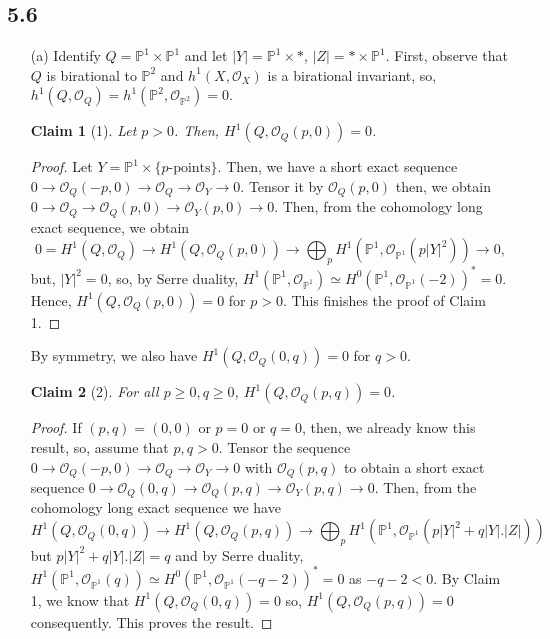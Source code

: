 \documentclass[11pt]{amsart}          %
\newcommand{\calO}{\mathcal{O}}
\newcommand{\bbP}{\mathbb{P}}
\newtheorem*{claim}{Claim}
\begin{document}
\subsection*{5.6}
\begin{enumerate}
\item [(a)] Identify $Q = \bbP^1 \times \bbP^1$ and let $|Y| = \bbP^1 \times *$, $|Z| = * \times \bbP^1$. First, observe that $Q$ is birational to $\bbP^2$ and $h^1 (X, \calO_X)$ is a birational invariant, so, $h^1(Q, \calO_Q) = h^1(\bbP^2, \calO_{\bbP^2}) = 0$. 

\begin{claim}[1] Let $p>0$. Then, $H^1(Q, \calO_Q (p,0)) = 0$.
\end{claim}

\begin{proof} Let $Y = \bbP^1 \times \{ p\mbox{-points} \}$. Then, we have a short exact sequence $0 \to \calO_Q (-p, 0) \to \calO_Q \to \calO_Y \to 0$. Tensor it by $\calO_Q (p,0)$ then, we obtain $0 \to \calO_Q \to \calO_Q (p,0) \to \calO_Y (p,0) \to 0$. Then, from the cohomology long exact sequence, we obtain
$$0 = H^1(Q, \calO_Q) \to H^1(Q, \calO_Q (p,0)) \to \bigoplus_p H^1(\bbP^1, \calO_{\bbP^1} (p |Y|^2)) \to 0,$$ but, $|Y|^2 = 0$, so, by Serre duality, $H^1(\bbP^1, \calO_{\bbP^1}) \simeq H^0 (\bbP^1, \calO_{\bbP^1} (-2) )^* = 0$. Hence, $H^1(Q, \calO_Q(p,0)) = 0$ for $p>0$. This finishes the proof of Claim 1.
\end{proof}

By symmetry, we also have $H^1(Q, \calO_Q (0,q)) = 0$ for $q>0$.

\begin{claim} [2] For all $p \geq 0, q \geq 0$, $H^1(Q, \calO_Q (p,q)) = 0$.
\end{claim}

\begin{proof} If $(p,q) = (0,0)$ or $p=0$ or $q=0$, then, we already know this result, so, assume that $p,q >0$. Tensor the sequence $0 \to \calO_Q (-p, 0) \to \calO_Q  \to \calO_Y \to 0$ with $\calO_Q (p, q)$ to obtain a short exact sequence $0 \to \calO_Q (0,q) \to \calO_Q (p,q) \to \calO_Y (p,q) \to 0$. Then, from the cohomology long exact sequence we have
$$H^1(Q, \calO_Q (0,q)) \to H^1(Q, \calO_Q (p,q)) \to \bigoplus_p H^1(\bbP^1, \calO_{\bbP^1} (p|Y|^2 + q |Y| . |Z|))$$ but $p |Y|^2 + q |Y|.|Z| = q$ and by Serre duality, $H^1(\bbP^1, \calO_{\bbP^1} (q)) \simeq H^0 (\bbP^1, \calO_{\bbP^1} (-q-2))^* = 0$ as $-q-2 <0$. By Claim 1, we know that $H^1 (Q, \calO_Q (0,q) ) = 0$ so, $H^1(Q, \calO_Q (p,q)) = 0$ consequently. This proves the result.
\end{proof}


\end{enumerate}
\end{document}
